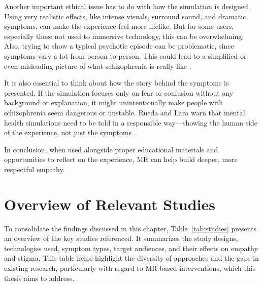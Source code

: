 \vspace{1em}

Another important ethical issue has to do with how the simulation is designed. Using very realistic effects, like intense visuals, surround sound, and dramatic symptoms, can make the experience feel more lifelike. But for some users, especially those not used to immersive technology, this can be overwhelming. Also, trying to show a typical psychotic episode can be problematic, since symptoms vary a lot from person to person. This could lead to a simplified or even misleading picture of what schizophrenia is really like \cite{Zare-Bidaki2022}.

It is also essential to think about how the story behind the symptoms is presented. If the simulation focuses only on fear or confusion without any background or explanation, it might unintentionally make people with schizophrenia seem dangerous or unstable. Rueda and Lara warn that mental health simulations need to be told in a responsible way—showing the human side of the experience, not just the symptoms \cite{Rueda2020}.

In conclusion, when used alongside proper educational materials and opportunities to reflect on the experience, MR can help build deeper, more respectful empathy. 

\section{Overview of Relevant Studies}
To consolidate the findings discussed in this chapter, Table~\ref{tab:studies} presents an overview of the key studies referenced. It summarizes the study designs, technologies used, symptom types, target audiences, and their effects on empathy and stigma. This table helps highlight the diversity of approaches and the gaps in existing research, particularly with regard to MR-based interventions, which this thesis aims to address.

